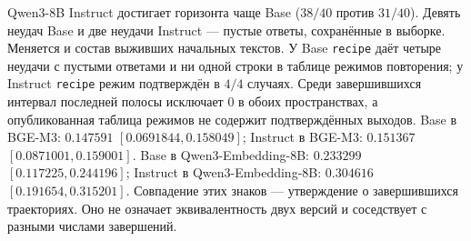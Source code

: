 \documentclass[10pt]{article}
\begin{document}
Qwen3-8B Instruct достигает горизонта чаще Base ($38/40$
против $31/40$). %
Девять неудач Base и две неудачи Instruct --- пустые ответы,
сохранённые в выборке. %
Меняется и состав выживших начальных текстов.
У Base \texttt{recipe} даёт четыре неудачи с пустыми ответами
и ни одной строки в таблице режимов повторения;
у Instruct \texttt{recipe} режим подтверждён в $4/4$ случаях. %
Среди завершившихся интервал последней полосы исключает $0$
в обоих пространствах, а опубликованная таблица режимов
не содержит подтверждённых выходов.
Base в BGE-M3: $0.147591$ $[0.0691844, 0.158049]$; %
Instruct в BGE-M3: $0.151367$ $[0.0871001, 0.159001]$. %
Base в Qwen3-Embedding-8B: $0.233299$ $[0.117225, 0.244196]$; %
Instruct в Qwen3-Embedding-8B: $0.304616$ $[0.191654, 0.315201]$. %
Совпадение этих знаков --- утверждение о завершившихся траекториях.
Оно не означает эквивалентность двух версий
и соседствует с разными числами завершений.
\end{document}
